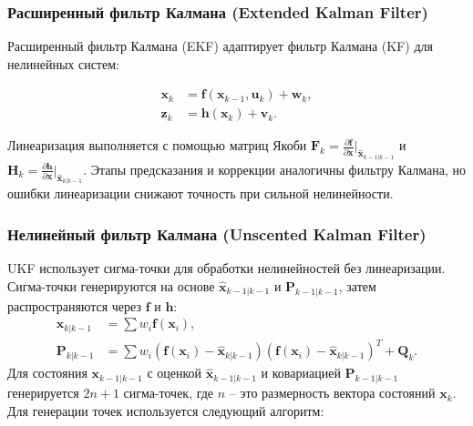 \subsubsection{Расширенный фильтр Калмана (Extended Kalman Filter)}
\label{ekf}


Расширенный фильтр Калмана (EKF) адаптирует фильтр Калмана (KF) для нелинейных систем:

\begin{align}
    \mathbf{x}_k &= \mathbf{f}(\mathbf{x}_{k-1}, \mathbf{u}_k) + \mathbf{w}_k, \\
    \mathbf{z}_k &= \mathbf{h}(\mathbf{x}_k) + \mathbf{v}_k.
\end{align}

Линеаризация выполняется с помощью матриц Якоби \(\mathbf{F}_k = \frac{\partial \mathbf{f}}{\partial \mathbf{x}}\big|_{\hat{\mathbf{x}}_{k-1|k-1}}\) и \(\mathbf{H}_k = \frac{\partial \mathbf{h}}{\partial \mathbf{x}}\big|_{\hat{\mathbf{x}}_{k|k-1}}\). Этапы предсказания и коррекции аналогичны фильтру Калмана, но ошибки линеаризации снижают точность при сильной нелинейности.

\subsubsection{Нелинейный фильтр Калмана (Unscented Kalman Filter)}
\label{sec:ukf_info}

UKF использует сигма-точки для обработки нелинейностей без линеаризации. Сигма-точки генерируются на основе \(\hat{\mathbf{x}}_{k-1|k-1}\) и \(\mathbf{P}_{k-1|k-1}\), затем распространяются через \(\mathbf{f}\) и \(\mathbf{h}\):
\begin{align}
    \hat{\mathbf{x}}_{k|k-1} &= \sum w_i \mathbf{f}(\mathbf{x}_i), \\
    \mathbf{P}_{k|k-1} &= \sum w_i (\mathbf{f}(\mathbf{x}_i) - \hat{\mathbf{x}}_{k|k-1})(\mathbf{f}(\mathbf{x}_i) - \hat{\mathbf{x}}_{k|k-1})^T + \mathbf{Q}_k.
\end{align}
Для состояния \(\mathbf{x}_{k-1|k-1}\) с оценкой 
\(\hat{\mathbf{x}}_{k-1|k-1}\) и ковариацией \(\mathbf{P}_{k-1|k-1}\) 
генерируется \(2n + 1\) сигма-точек, где \(n\)  -- это размерность вектора состояний \(\mathbf{x}_k\).
Для генерации точек используется следующий алгоритм:

